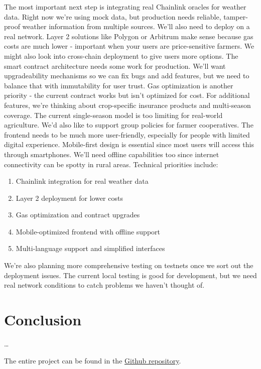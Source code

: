 \documentclass[11pt,a4paper]{article}
\begin{document}
	The most important next step is integrating real Chainlink oracles for weather data.
	Right now we're using mock data, but production needs reliable, tamper-proof weather information from multiple sources.
	We'll also need to deploy on a real network.
	Layer 2 solutions like Polygon or Arbitrum make sense because gas costs are much lower - important when your users are price-sensitive farmers.
	We might also look into cross-chain deployment to give users more options.
	The smart contract architecture needs some work for production.
	We'll want upgradeability mechanisms so we can fix bugs and add features, but we need to balance that with immutability for user trust.
	Gas optimization is another priority - the current contract works but isn't optimized for cost.
	For additional features, we're thinking about crop-specific insurance products and multi-season coverage.
	The current single-season model is too limiting for real-world agriculture.
	We'd also like to support group policies for farmer cooperatives.
	The frontend needs to be much more user-friendly, especially for people with limited digital experience.
	Mobile-first design is essential since most users will access this through smartphones.
	We'll need offline capabilities too since internet connectivity can be spotty in rural areas.
	Technical priorities include:

	\begin{enumerate}
		\item Chainlink integration for real weather data
		\item Layer 2 deployment for lower costs
		\item Gas optimization and contract upgrades
		\item Mobile-optimized frontend with offline support
		\item Multi-language support and simplified interfaces
	\end{enumerate}

	We're also planning more comprehensive testing on testnets once we sort out the deployment issues.
	The current local testing is good for development, but we need real network conditions to catch problems we haven't thought of.


	\section{Conclusion}\label{sec:conclusion}
	\ldots

    The entire project can be found in the \href{https://github.com/vincentschall/decentralized_weather_insurance}{Github repository}.
\end{document}
